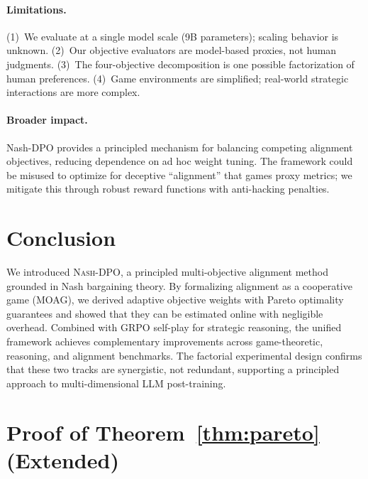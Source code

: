 \documentclass{article}
\newcommand{\NashDPO}{\textsc{Nash-DPO}}
\begin{document}
\paragraph{Limitations.}
(1)~We evaluate at a single model scale (9B parameters); scaling behavior is unknown.
(2)~Our objective evaluators are model-based proxies, not human judgments.
(3)~The four-objective decomposition is one possible factorization of human preferences.
(4)~Game environments are simplified; real-world strategic interactions are more complex.

\paragraph{Broader impact.}
Nash-DPO provides a principled mechanism for balancing competing alignment objectives, reducing dependence on ad hoc weight tuning.
The framework could be misused to optimize for deceptive ``alignment'' that games proxy metrics; we mitigate this through robust reward functions with anti-hacking penalties.


\section{Conclusion}
\label{sec:conclusion}

We introduced \NashDPO{}, a principled multi-objective alignment method grounded in Nash bargaining theory.
By formalizing alignment as a cooperative game (MOAG), we derived adaptive objective weights with Pareto optimality guarantees and showed that they can be estimated online with negligible overhead.
Combined with GRPO self-play for strategic reasoning, the unified framework achieves complementary improvements across game-theoretic, reasoning, and alignment benchmarks.
The factorial experimental design confirms that these two tracks are synergistic, not redundant, supporting a principled approach to multi-dimensional LLM post-training.






\appendix

\section{Proof of Theorem~\ref{thm:pareto} (Extended)}
\label{app:proof_pareto}
\end{document}
